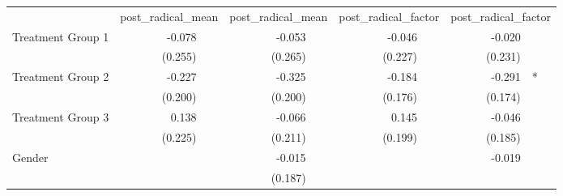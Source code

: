 \documentclass{article}
\begin{document}
\begin{table}[!h]
\centering
\begin{tabular}{lllllllll}
\cline{1-9}
\multicolumn{1}{r}{} &
  \multicolumn{2}{c}{post\_radical\_mean} &
  \multicolumn{2}{c}{post\_radical\_mean} &
  \multicolumn{2}{c}{post\_radical\_factor} &
  \multicolumn{2}{c}{post\_radical\_factor} \\
\cline{1-9}
\multicolumn{1}{l}{Treatment Group 1} &
  \multicolumn{1}{r}{-0.078} &
  \multicolumn{1}{l}{} &
  \multicolumn{1}{r}{-0.053} &
  \multicolumn{1}{l}{} &
  \multicolumn{1}{r}{-0.046} &
  \multicolumn{1}{l}{} &
  \multicolumn{1}{r}{-0.020} &
  \multicolumn{1}{l}{} \\
\multicolumn{1}{l}{} &
  \multicolumn{1}{r}{(0.255)} &
  \multicolumn{1}{l}{} &
  \multicolumn{1}{r}{(0.265)} &
  \multicolumn{1}{l}{} &
  \multicolumn{1}{r}{(0.227)} &
  \multicolumn{1}{l}{} &
  \multicolumn{1}{r}{(0.231)} &
  \multicolumn{1}{l}{} \\
\multicolumn{1}{l}{Treatment Group 2} &
  \multicolumn{1}{r}{-0.227} &
  \multicolumn{1}{l}{} &
  \multicolumn{1}{r}{-0.325} &
  \multicolumn{1}{l}{} &
  \multicolumn{1}{r}{-0.184} &
  \multicolumn{1}{l}{} &
  \multicolumn{1}{r}{-0.291} &
  \multicolumn{1}{l}{*} \\
\multicolumn{1}{l}{} &
  \multicolumn{1}{r}{(0.200)} &
  \multicolumn{1}{l}{} &
  \multicolumn{1}{r}{(0.200)} &
  \multicolumn{1}{l}{} &
  \multicolumn{1}{r}{(0.176)} &
  \multicolumn{1}{l}{} &
  \multicolumn{1}{r}{(0.174)} &
  \multicolumn{1}{l}{} \\
\multicolumn{1}{l}{Treatment Group 3} &
  \multicolumn{1}{r}{0.138} &
  \multicolumn{1}{l}{} &
  \multicolumn{1}{r}{-0.066} &
  \multicolumn{1}{l}{} &
  \multicolumn{1}{r}{0.145} &
  \multicolumn{1}{l}{} &
  \multicolumn{1}{r}{-0.046} &
  \multicolumn{1}{l}{} \\
\multicolumn{1}{l}{} &
  \multicolumn{1}{r}{(0.225)} &
  \multicolumn{1}{l}{} &
  \multicolumn{1}{r}{(0.211)} &
  \multicolumn{1}{l}{} &
  \multicolumn{1}{r}{(0.199)} &
  \multicolumn{1}{l}{} &
  \multicolumn{1}{r}{(0.185)} &
  \multicolumn{1}{l}{} \\
\multicolumn{1}{l}{Gender} &
  \multicolumn{1}{r}{} &
  \multicolumn{1}{l}{} &
  \multicolumn{1}{r}{-0.015} &
  \multicolumn{1}{l}{} &
  \multicolumn{1}{r}{} &
  \multicolumn{1}{l}{} &
  \multicolumn{1}{r}{-0.019} &
  \multicolumn{1}{l}{} \\
\multicolumn{1}{l}{} &
  \multicolumn{1}{r}{} &
  \multicolumn{1}{l}{} &
  \multicolumn{1}{r}{(0.187)} &
  \multicolumn{1}{l}{} &

\end{tabular}
\end{table}
\end{document}
